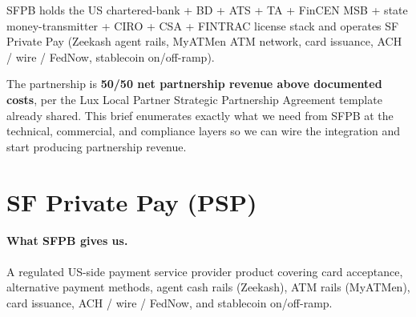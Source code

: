 \documentclass[11pt,letterpaper]{article}
\begin{document}
SFPB holds the US chartered-bank + BD + ATS + TA + FinCEN MSB +
state money-transmitter + CIRO + CSA + FINTRAC license stack and
operates SF Private Pay (Zeekash agent rails, MyATMen ATM network, card
issuance, ACH / wire / FedNow, stablecoin on/off-ramp).

The partnership is \textbf{50/50 net partnership revenue above
documented costs}, per the Lux \texttimes{} Local Partner Strategic
Partnership Agreement template already shared. This brief enumerates
exactly what we need from SFPB at the technical, commercial, and
compliance layers so we can wire the integration and start producing
partnership revenue.

\section{SF Private Pay (PSP)}

\paragraph{What SFPB gives us.}
A regulated US-side payment service provider product covering card
acceptance, alternative payment methods, agent cash rails (Zeekash),
ATM rails (MyATMen), card issuance, ACH / wire / FedNow, and stablecoin
on/off-ramp.
\end{document}
